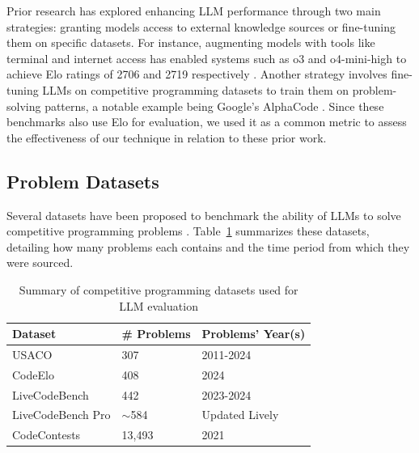 \documentclass[preprint,12pt]{elsarticle}
\begin{document}
Prior research has explored enhancing LLM performance through two main strategies: granting models access to external knowledge sources or fine-tuning them on specific datasets. For instance, augmenting models with tools like terminal and internet access has enabled systems such as o3 and o4-mini-high to achieve Elo ratings of 2706 and 2719 respectively \cite{openai2025introducing}. Another strategy involves fine-tuning LLMs on competitive programming datasets to train them on problem-solving patterns, a notable example being Google’s AlphaCode \cite{li2022competition}. Since these benchmarks also use Elo for evaluation, we used it as a common metric to assess the effectiveness of our technique in relation to these prior work.

\subsection{Problem Datasets}

Several datasets have been proposed to benchmark the ability of LLMs to solve competitive programming problems \cite{shi2024languagemodelssolveolympiad, quan2025codeelobenchmarkingcompetitionlevelcode, jain2024livecodebenchholisticcontaminationfree, zheng2025livecodebenchproolympiadmedalists, li2022competition}. Table~\ref{tab:datasets} summarizes these datasets, detailing how many problems each contains and the time period from which they were sourced.

\begin{table}[h]
\centering
\caption{Summary of competitive programming datasets used for LLM evaluation}
\label{tab:datasets}
\begin{tabular}{p{5cm} p{3cm} p{4cm}}
\toprule
\textbf{Dataset} & \textbf{\# Problems} & \textbf{Problems' Year(s)} \\
\midrule
USACO \cite{shi2024languagemodelssolveolympiad} & 307 & 2011-2024 \\
CodeElo \cite{quan2025codeelobenchmarkingcompetitionlevelcode} & 408 & 2024 \\
LiveCodeBench \cite{jain2024livecodebenchholisticcontaminationfree} & 442 & 2023-2024 \\
LiveCodeBench Pro \cite{zheng2025livecodebenchproolympiadmedalists} & $\sim$584 & Updated Lively \\
CodeContests \cite{li2022competition} & 13,493 & 2021 \\
\bottomrule
\end{tabular}
\end{table}
\end{document}
